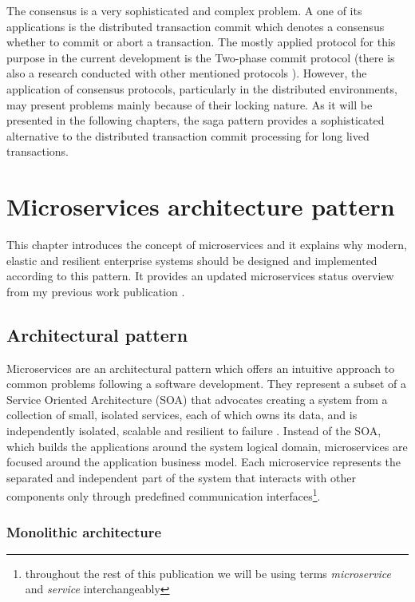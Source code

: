 \documentclass[oneside,
  digital, %
  table,   %
  lof,     %
  lot,     %
]{fithesis3}
\begin{document}
The consensus is a very sophisticated and complex problem. A one of its applications is the distributed transaction commit which denotes a consensus whether to commit or abort a transaction. The mostly applied protocol for this purpose in the current development is the Two-phase commit protocol \cite{xa_spec, ws-at} (there is also a research conducted with other mentioned protocols \cite{paxosTransCommit}). However, the application of consensus protocols, particularly in the distributed environments, may present problems mainly because of their locking nature. As it will be presented in the following chapters, the saga pattern \cite{sagas_publ} provides a sophisticated alternative to the distributed transaction commit processing for long lived transactions.



\clearpage
\chapter{Microservices architecture pattern}

This chapter introduces the concept of microservices and it explains why modern, elastic and resilient enterprise systems should be designed and implemented according to this pattern. It provides an updated microservices status overview from my previous work publication \cite{bachelor_thesis}.

\section{Architectural pattern}

Microservices are an architectural pattern which offers an intuitive approach to common problems following a software development. They represent a subset of a Service Oriented Architecture (SOA) \cite{soa} that advocates creating a system from a collection of small, isolated services, each of which owns its data, and is independently isolated, scalable and resilient to failure \cite{reactive_ms_arch}. Instead of the SOA, which builds the applications around the system logical domain, microservices are focused around the application business model. Each microservice represents the separated and independent part of the system that interacts with other components only through predefined communication interfaces\footnote{throughout the rest of this publication we will be using terms \textit{microservice} and \textit{service} interchangeably}.

\subsection{Monolithic architecture}
\end{document}
